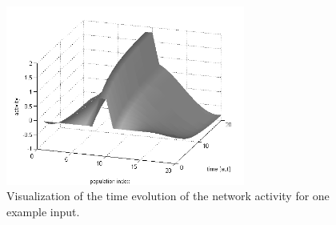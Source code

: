 \documentclass{scrartcl}
\begin{document}
\begin{figure}[h]
\centering
\includegraphics[trim = {0.4cm 0 0.7cm 0.7cm}, width=0.7\textwidth, clip]{../pics/all}
\caption{Visualization of the time evolution of the network activity for one example input.}
\label{label}
\end{figure}
\end{document}
